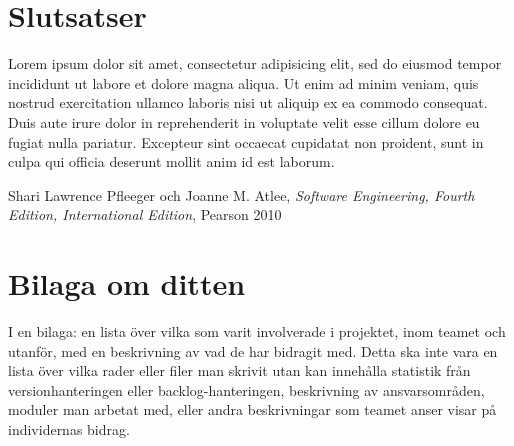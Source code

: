 \documentclass[a4paper,12pt,oneside,final]{extbook}
\begin{document}
\chapter{Slutsatser}

Lorem ipsum dolor sit amet, consectetur adipisicing elit, sed do eiusmod tempor incididunt ut labore et dolore magna aliqua. Ut enim ad minim veniam, quis nostrud exercitation ullamco laboris nisi ut aliquip ex ea commodo consequat. Duis aute irure dolor in reprehenderit in voluptate velit esse cillum dolore eu fugiat nulla pariatur. Excepteur sint occaecat cupidatat non proident, sunt in culpa qui officia deserunt mollit anim id est laborum.


\begin{thebibliography}{9}
  
  Shari Lawrence Pfleeger och Joanne M. Atlee, \emph{Software Engineering, Fourth Edition, International Edition}, Pearson 2010
  
\end{thebibliography}

\appendix

\chapter{Bilaga om ditten}

I en bilaga: en lista över vilka som varit involverade i projektet, inom teamet och utanför, med en beskrivning av vad de har bidragit med. Detta ska inte vara en lista över vilka rader eller filer man skrivit utan kan innehålla statistik från versionhanteringen eller backlog-hanteringen, beskrivning av ansvarsområden, moduler man arbetat med, eller andra beskrivningar som teamet anser visar på individernas bidrag.
\end{document}
